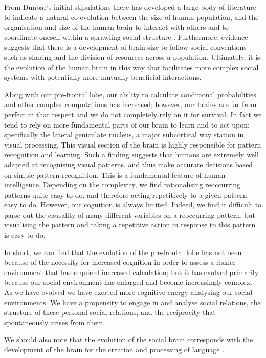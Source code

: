 From Dunbar's initial stipulations there has developed a large body of literature to indicate a natural co-evolution between the size of human population, and the organisation and size of the human brain to interact with others and to coordinate oneself within a sprawling social structure \citep{David-BarrettDunbar2013, Dunbar2014a}. Furthermore, evidence suggests that there is a development of brain size to follow social conventions such as sharing and the division of resources across a population. Ultimately, it is the evolution of the human brain in this way that facilitates more complex social systems with potentially more mutually beneficial interactions.

Along with our pre-frontal lobe, our ability to calculate conditional probabilities and other complex computations has increased; however, our brains are far from perfect in that respect and we do not completely rely on it for survival. In fact we tend to rely on more fundamental parts of our brain to learn and to act upon; specifically the lateral geniculate nucleus, a major subcortical way station in visual processing. This visual section of the brain is highly responsible for pattern recognition and learning. Such a finding suggests that humans are extremely well adapted at recognising visual patterns, and thus make accurate decisions based on simple pattern recognition. This is a fundamental feature of human intelligence. Depending on the complexity, we find rationalising reoccurring patterns quite easy to do, and therefore acting repetitively to a given pattern easy to do. However, our cognition is always limited. Indeed, we find it difficult to parse out the causality of many different variables on a reoccurring pattern, but visualising the pattern and taking a repetitive action in response to this pattern is easy to do.

In short, we can find that the evolution of the pre-frontal lobe has not been because of the necessity for increased cognition in order to assess a riskier environment that has required increased calculation; but it has evolved primarily because our social environment has enlarged and become increasingly complex. As we have evolved we have exerted more cognitive energy analysing our social environments. We have a propensity to engage in and analyse social relations, the structure of these personal social relations, and the reciprocity that spontaneously arises from them.

We should also note that the evolution of the social brain corresponds with the development of the brain for the creation and processing of language \citep{Dunbar1998b}.

